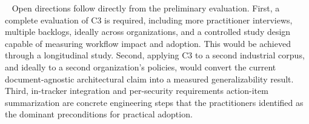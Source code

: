 ~\label{sec:future-work}
Open directions follow directly from the preliminary evaluation.
First, a complete evaluation of C3 is required, including more practitioner interviews, multiple backlogs, ideally across organizations, and a controlled study design capable of measuring workflow impact and adoption.
This would be achieved through a longitudinal study.
Second, applying C3 to a second industrial corpus, and ideally to a second organization's policies, would convert the current document-agnostic architectural claim into a measured generalizability result.
Third, in-tracker integration and per-security requirements action-item summarization are concrete engineering steps that the practitioners identified as the dominant preconditions for practical adoption.
